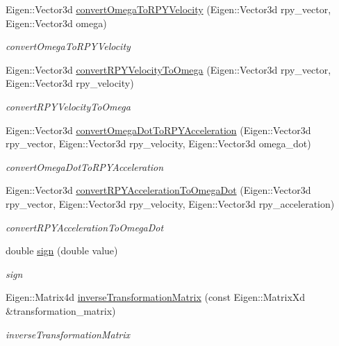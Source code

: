 \begin{DoxyCompactItemize}
Eigen\+::\+Vector3d \hyperlink{namespacerobotis__manipulator_1_1math_ae69e1aacc48ed72442eb4dc82e280be0}{convert\+Omega\+To\+R\+P\+Y\+Velocity} (Eigen\+::\+Vector3d rpy\+\_\+vector, Eigen\+::\+Vector3d omega)
\begin{DoxyCompactList}\small\item\em convert\+Omega\+To\+R\+P\+Y\+Velocity \end{DoxyCompactList}\item 
Eigen\+::\+Vector3d \hyperlink{namespacerobotis__manipulator_1_1math_a73d50f3962eeac18f464f879e6a0c8fc}{convert\+R\+P\+Y\+Velocity\+To\+Omega} (Eigen\+::\+Vector3d rpy\+\_\+vector, Eigen\+::\+Vector3d rpy\+\_\+velocity)
\begin{DoxyCompactList}\small\item\em convert\+R\+P\+Y\+Velocity\+To\+Omega \end{DoxyCompactList}\item 
Eigen\+::\+Vector3d \hyperlink{namespacerobotis__manipulator_1_1math_aabd3cc7c059a6372e917bc98a3e5c1dd}{convert\+Omega\+Dot\+To\+R\+P\+Y\+Acceleration} (Eigen\+::\+Vector3d rpy\+\_\+vector, Eigen\+::\+Vector3d rpy\+\_\+velocity, Eigen\+::\+Vector3d omega\+\_\+dot)
\begin{DoxyCompactList}\small\item\em convert\+Omega\+Dot\+To\+R\+P\+Y\+Acceleration \end{DoxyCompactList}\item 
Eigen\+::\+Vector3d \hyperlink{namespacerobotis__manipulator_1_1math_a752d1631596538515894f09f210eb17b}{convert\+R\+P\+Y\+Acceleration\+To\+Omega\+Dot} (Eigen\+::\+Vector3d rpy\+\_\+vector, Eigen\+::\+Vector3d rpy\+\_\+velocity, Eigen\+::\+Vector3d rpy\+\_\+acceleration)
\begin{DoxyCompactList}\small\item\em convert\+R\+P\+Y\+Acceleration\+To\+Omega\+Dot \end{DoxyCompactList}\item 
double \hyperlink{namespacerobotis__manipulator_1_1math_a27a6dd481239e8377185dac85cf9cd77}{sign} (double value)
\begin{DoxyCompactList}\small\item\em sign \end{DoxyCompactList}\item 
Eigen\+::\+Matrix4d \hyperlink{namespacerobotis__manipulator_1_1math_a0e23b77220a7f83814de154838a47be7}{inverse\+Transformation\+Matrix} (const Eigen\+::\+Matrix\+Xd \&transformation\+\_\+matrix)
\begin{DoxyCompactList}\small\item\em inverse\+Transformation\+Matrix \end{DoxyCompactList}\item 

\end{DoxyCompactItemize}
